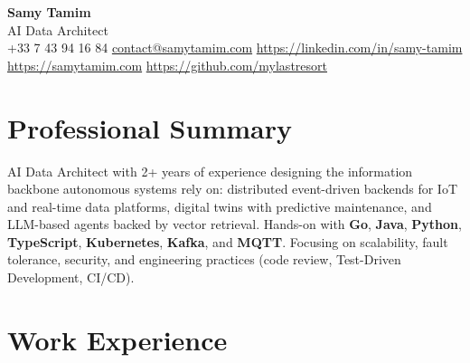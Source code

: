 \documentclass[10pt,a4paper]{article}
\newcommand{\skill}[1]{\textbf{#1}}
\newcommand{\skill}[1]{\textbf{#1}}
\begin{document}
\begin{center}
  {\LARGE\bfseries\color{accent} Samy Tamim}\\[1.5pt]
  {\small AI Data Architect}\\[1.5pt]
  \footnotesize
  +33 7 43 94 16 84 \enspace\textbullet\enspace \href{mailto:contact@samytamim.com}{contact@samytamim.com} \enspace\textbullet\enspace \href{https://linkedin.com/in/samy-tamim}{https://linkedin.com/in/samy-tamim} \enspace\textbullet\enspace \href{https://samytamim.com}{https://samytamim.com} \enspace\textbullet\enspace \href{https://github.com/mylastresort}{https://github.com/mylastresort}
\end{center}

\section{Professional Summary}
AI Data Architect with 2+ years of experience designing the information backbone autonomous systems rely on: distributed event-driven backends for IoT and real-time data platforms, digital twins with predictive maintenance, and LLM-based agents backed by vector retrieval. Hands-on with \skill{Go}, \skill{Java}, \skill{Python}, \skill{TypeScript}, \skill{Kubernetes}, \skill{Kafka}, and \skill{MQTT}. Focusing on scalability, fault tolerance, security, and engineering practices (code review, Test-Driven Development, CI/CD).

\section{Work Experience}
\end{document}
